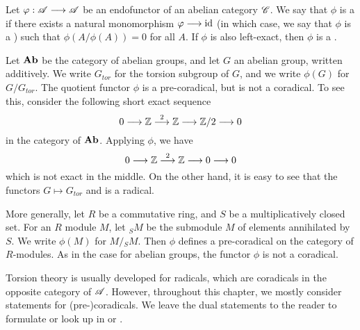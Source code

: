 \begin{defn}\label{def_radical}
Let $\varphi: \mathscr{A} \longrightarrow \mathscr{A}$ be an endofunctor of an abelian 
category $\mathscr{C}$. We say that $\phi$ is a  if 
there exists a natural monomorphism $\varphi \longrightarrow \mathrm{id}$ (in which case, we
say that $\phi$ is a ) such that 
$\phi(A/\phi(A)) = 0$ for all $A$. If $\phi$ is also left-exact, then
$\phi$ is a .
\end{defn}

\begin{ex}
Let $\mathbf{Ab}$ be the category of abelian groups, and let $G$ an
abelian group, written additively. We write $G_{tor}$ for the 
torsion subgroup of $G$, and we write $\phi(G)$ for $G/G_{tor}$.
The quotient functor $\phi$ is a pre-coradical, but is not a 
coradical. To see this, consider the following short exact 
sequence
\[
0 \longrightarrow \mathbb{Z} \stackrel{2}{\longrightarrow} \mathbb{Z} \longrightarrow \mathbb{Z}/2 \longrightarrow 0
\]
in the category of $\mathbf{Ab}$. Applying $\phi$, we have
\[
0 \longrightarrow \mathbb{Z} \stackrel{2}{\longrightarrow} \mathbb{Z} \longrightarrow 0 \longrightarrow 0
\]
which is not exact in the middle. On the other hand, it is easy to 
see that the functors $G \mapsto G_{tor}$ and is a radical.

More generally, let $R$ be a commutative ring, and $S$ be a 
multiplicatively closed set. For an $R$ module $M$, let ${}_SM$
be the submodule $M$ of elements annihilated by $S$. We write
$\phi(M)$ for $M/{}_SM$. Then $\phi$ defines a pre-coradical on
the category of $R$-modules. As in the case for abelian groups,
the functor $\phi$ is not a coradical.
\end{ex}

Torsion theory is usually developed for radicals, which 
are coradicals in the opposite category of $\mathscr{A}$. However, 
throughout this chapter, we mostly consider statements for
(pre-)coradicals. We leave the dual statements to the 
reader to formulate or look up in \cite{DTor} or 
\cite[Section 1.2]{BJV}.

